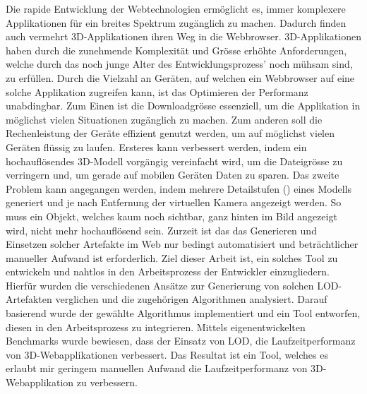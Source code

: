Die rapide Entwicklung der Webtechnologien ermöglicht es, immer komplexere Applikationen für ein breites Spektrum zugänglich zu machen. Dadurch finden auch vermehrt 3D-Applikationen ihren Weg in die Webbrowser.
3D-Applikationen haben durch die zunehmende Komplexität und Grösse erhöhte Anforderungen, welche durch das noch junge Alter des Entwicklungsprozess' noch mühsam sind, zu erfüllen.
Durch die Vielzahl an Geräten, auf welchen ein Webbrowser auf eine solche Applikation zugreifen kann, ist das Optimieren der Performanz unabdingbar.
Zum Einen ist die Downloadgrösse essenziell, um die Applikation in möglichst vielen Situationen zugänglich zu machen. Zum anderen soll die Rechenleistung der Geräte effizient genutzt werden, um auf möglichst vielen Geräten flüssig zu laufen.
Ersteres kann verbessert werden, indem ein hochauflösendes 3D-Modell vorgängig vereinfacht wird, um die Dateigrösse zu verringern und, um gerade auf mobilen Geräten Daten zu sparen.
Das zweite Problem kann angegangen werden, indem mehrere Detailstufen () eines Modells generiert und je nach Entfernung der virtuellen Kamera angezeigt werden. So muss ein Objekt, welches kaum noch sichtbar, ganz hinten im Bild angezeigt wird, nicht mehr hochauflösend sein.
Zurzeit ist das das Generieren und Einsetzen solcher Artefakte im Web nur bedingt automatisiert und beträchtlicher manueller Aufwand ist erforderlich.
Ziel dieser Arbeit ist, ein solches Tool zu entwickeln und nahtlos in den Arbeitsprozess der Entwickler einzugliedern.
\bigbreak
Hierfür wurden die verschiedenen Ansätze zur Generierung von solchen LOD-Artefakten verglichen und die zugehörigen Algorithmen analysiert.
Darauf basierend wurde der gewählte Algorithmus implementiert und ein Tool entworfen, diesen in den Arbeitsprozess zu integrieren.
Mittels eigenentwickelten Benchmarks wurde bewiesen, dass der Einsatz von LOD, die Laufzeitperformanz von 3D-Webapplikationen verbessert.
\bigbreak
Das Resultat ist ein Tool, welches es erlaubt mir geringem manuellen Aufwand die Laufzeitperformanz von 3D-Webapplikation zu verbessern.
